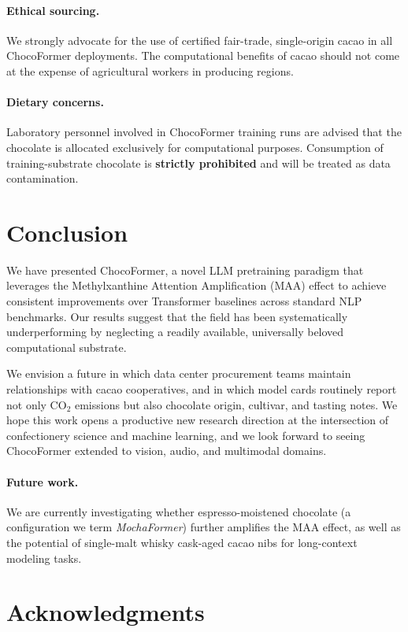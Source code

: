 \documentclass[11pt,a4paper]{article}
\begin{document}
\paragraph{Ethical sourcing.} We strongly advocate for the use of certified fair-trade, single-origin cacao in all ChocoFormer deployments. The computational benefits of cacao should not come at the expense of agricultural workers in producing regions.

\paragraph{Dietary concerns.} Laboratory personnel involved in ChocoFormer training runs are advised that the chocolate is allocated exclusively for computational purposes. Consumption of training-substrate chocolate is \textbf{strictly prohibited} and will be treated as data contamination.

\section{Conclusion}

We have presented ChocoFormer, a novel LLM pretraining paradigm that leverages the Methylxanthine Attention Amplification (MAA) effect to achieve consistent improvements over Transformer baselines across standard NLP benchmarks. Our results suggest that the field has been systematically underperforming by neglecting a readily available, universally beloved computational substrate.

We envision a future in which data center procurement teams maintain relationships with cacao cooperatives, and in which model cards routinely report not only CO$_2$ emissions but also chocolate origin, cultivar, and tasting notes. We hope this work opens a productive new research direction at the intersection of confectionery science and machine learning, and we look forward to seeing ChocoFormer extended to vision, audio, and multimodal domains.

\paragraph{Future work.} We are currently investigating whether espresso-moistened chocolate (a configuration we term \textit{MochaFormer}) further amplifies the MAA effect, as well as the potential of single-malt whisky cask-aged cacao nibs for long-context modeling tasks.

\section*{Acknowledgments}
\end{document}
